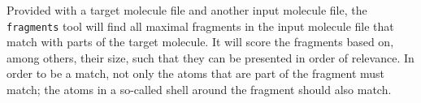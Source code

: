 


Provided with a target molecule file and another input molecule file, the \verb|fragments| tool will find all maximal fragments in the input molecule file that match with parts of the target molecule. It will score the fragments based on, among others, their size, such that they can be presented in order of relevance. In order to be a match, not only the atoms that are part of the fragment must match; the atoms in a so-called shell around the fragment should also match.

